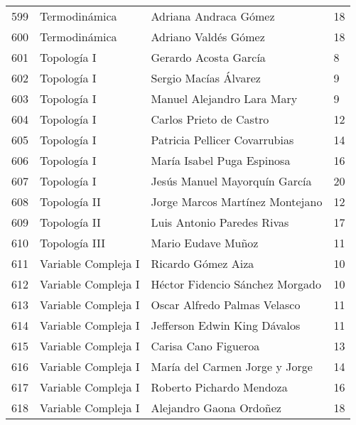 \begin{table}[ht]
\begin{tabular}{rlll}
  599 & Termodinámica & Adriana Andraca Gómez & 18 \\ 
  600 & Termodinámica & Adriano Valdés Gómez & 18 \\ 
  601 & Topología I & Gerardo Acosta García & 8 \\ 
  602 & Topología I & Sergio Macías Álvarez & 9 \\ 
  603 & Topología I & Manuel Alejandro Lara Mary & 9 \\ 
  604 & Topología I & Carlos Prieto de Castro & 12 \\ 
  605 & Topología I & Patricia Pellicer Covarrubias & 14 \\ 
  606 & Topología I & María Isabel Puga Espinosa & 16 \\ 
  607 & Topología I & Jesús Manuel Mayorquín García & 20 \\ 
  608 & Topología II & Jorge Marcos Martínez Montejano & 12 \\ 
  609 & Topología II & Luis Antonio Paredes Rivas & 17 \\ 
  610 & Topología III & Mario Eudave Muñoz & 11 \\ 
  611 & Variable Compleja I & Ricardo Gómez Aiza & 10 \\ 
  612 & Variable Compleja I & Héctor Fidencio Sánchez Morgado & 10 \\ 
  613 & Variable Compleja I & Oscar Alfredo Palmas Velasco & 11 \\ 
  614 & Variable Compleja I & Jefferson Edwin King Dávalos & 11 \\ 
  615 & Variable Compleja I & Carisa Cano Figueroa & 13 \\ 
  616 & Variable Compleja I & María del Carmen Jorge y Jorge & 14 \\ 
  617 & Variable Compleja I & Roberto Pichardo Mendoza & 16 \\ 
  618 & Variable Compleja I & Alejandro Gaona Ordoñez & 18 \\ 
   \hline
\end{tabular}
\end{table}